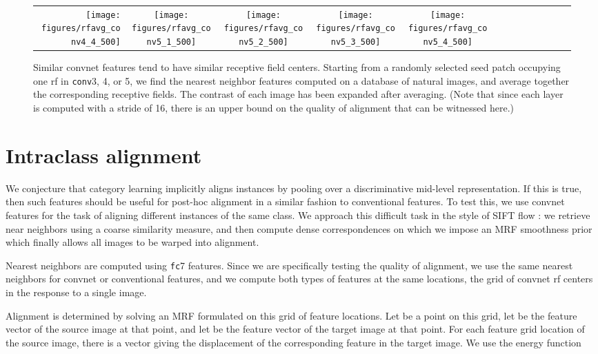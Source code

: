\documentclass{article} \usepackage{nips14submit_e,times}
\begin{document}
\begin{figure}
{\begin{tabular}{rcccc@{\hskip 5pt}cccc@{\hskip 5pt}cccc}
\texttt{[image: figures/rfavg\_conv4\_4\_500]} &
\texttt{[image: figures/rfavg\_conv5\_1\_500]} &
\texttt{[image: figures/rfavg\_conv5\_2\_500]} &
\texttt{[image: figures/rfavg\_conv5\_3\_500]} &
\texttt{[image: figures/rfavg\_conv5\_4\_500]}
\end{tabular}
}
\caption{
Similar convnet features tend to have similar receptive field centers.
Starting from a randomly selected seed patch occupying one rf in
\texttt{conv}3, 4, or 5, we find the nearest  neighbor features computed on a
database of natural images, and average together the corresponding receptive
fields.
The contrast of each image has been expanded after averaging.
(Note that since each layer is computed with a stride of 16, there is an
upper bound on the quality of alignment that can be witnessed here.)
}
\label{fig:rfavg}
\end{figure}



\section{Intraclass alignment}
\label{sec:flow}
We conjecture that category learning implicitly aligns instances by pooling over
a discriminative mid-level representation.
If this is true, then such features should be useful for post-hoc alignment in a
similar fashion to conventional features.
To test this, we use convnet features for the task of aligning different instances
of the same class.
We approach this difficult task in the style of SIFT flow \cite{sift-flow}: we
retrieve near neighbors using a coarse similarity measure, and then compute
dense correspondences on which we impose an MRF smoothness prior which finally
allows all images to be warped into alignment.

Nearest neighbors are computed using \texttt{fc}7 features.
Since we are specifically testing the quality of alignment, we use the
same nearest neighbors for convnet or conventional features, and we compute both
types of features at the same locations, the grid of convnet rf centers in the
response to a single image.

Alignment is determined by solving an MRF formulated on this grid of feature
locations.
Let  be a point on this grid, let  be the feature vector of the
source image at that point, and let  be the feature vector of the target
image at that point.
For each feature grid location  of the source image, there is a vector 
giving the displacement of the corresponding feature in the target image.
We use the energy function
\end{document}
